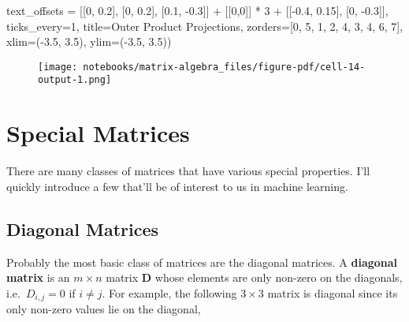 \documentclass[
  letterpaper,
  DIV=11,
  numbers=noendperiod]{scrreprt}
\newenvironment{Shaded}{\begin{snugshade}}{\end{snugshade}}
\newcommand{\DecValTok}[1]{\textcolor[rgb]{0.68,0.00,0.00}{#1}}
\newcommand{\FloatTok}[1]{\textcolor[rgb]{0.68,0.00,0.00}{#1}}
\newcommand{\NormalTok}[1]{\textcolor[rgb]{0.00,0.23,0.31}{#1}}
\newcommand{\OperatorTok}[1]{\textcolor[rgb]{0.37,0.37,0.37}{#1}}
\newcommand{\StringTok}[1]{\textcolor[rgb]{0.13,0.47,0.30}{#1}}
\begin{document}
\begin{Shaded}
\begin{Highlighting}[]
\NormalTok{    text\_offsets }\OperatorTok{=}\NormalTok{ [[}\DecValTok{0}\NormalTok{, }\FloatTok{0.2}\NormalTok{], [}\DecValTok{0}\NormalTok{, }\FloatTok{0.2}\NormalTok{], [}\FloatTok{0.1}\NormalTok{, }\OperatorTok{{-}}\FloatTok{0.3}\NormalTok{]] }\OperatorTok{+}\NormalTok{ [[}\DecValTok{0}\NormalTok{,}\DecValTok{0}\NormalTok{]] }\OperatorTok{*} \DecValTok{3} \OperatorTok{+}\NormalTok{ [[}\OperatorTok{{-}}\FloatTok{0.4}\NormalTok{, }\FloatTok{0.15}\NormalTok{], [}\DecValTok{0}\NormalTok{, }\OperatorTok{{-}}\FloatTok{0.3}\NormalTok{]], ticks\_every}\OperatorTok{=}\DecValTok{1}\NormalTok{,}
\NormalTok{    title}\OperatorTok{=}\StringTok{\textquotesingle{}Outer Product Projections\textquotesingle{}}\NormalTok{, zorders}\OperatorTok{=}\NormalTok{[}\DecValTok{0}\NormalTok{, }\DecValTok{5}\NormalTok{, }\DecValTok{1}\NormalTok{, }\DecValTok{2}\NormalTok{, }\DecValTok{4}\NormalTok{, }\DecValTok{3}\NormalTok{, }\DecValTok{4}\NormalTok{, }\DecValTok{6}\NormalTok{, }\DecValTok{7}\NormalTok{], xlim}\OperatorTok{=}\NormalTok{(}\OperatorTok{{-}}\FloatTok{3.5}\NormalTok{, }\FloatTok{3.5}\NormalTok{), ylim}\OperatorTok{=}\NormalTok{(}\OperatorTok{{-}}\FloatTok{3.5}\NormalTok{, }\FloatTok{3.5}\NormalTok{))}
\end{Highlighting}
\end{Shaded}

\begin{figure}[H]

{\centering \texttt{[image: notebooks/matrix-algebra\_files/figure-pdf/cell-14-output-1.png]}

}

\end{figure}

\hypertarget{special-matrices}{%
\section{Special Matrices}\label{special-matrices}}

There are many classes of matrices that have various special properties.
I'll quickly introduce a few that'll be of interest to us in machine
learning.

\hypertarget{diagonal-matrices}{%
\subsection{Diagonal Matrices}\label{diagonal-matrices}}

Probably the most basic class of matrices are the diagonal matrices. A
\textbf{diagonal matrix} is an \(m \times n\) matrix \(\mathbf{D}\)
whose elements are only non-zero on the diagonals, i.e.~\(D_{i,j} = 0\)
if \(i \neq j\). For example, the following \(3 \times 3\) matrix is
diagonal since its only non-zero values lie on the diagonal,
\end{document}
